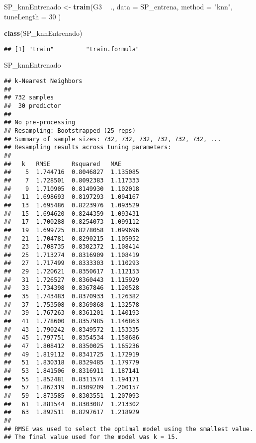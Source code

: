 \documentclass[
]{article}
\newenvironment{Shaded}{\begin{snugshade}}{\end{snugshade}}
\newcommand{\DataTypeTok}[1]{\textcolor[rgb]{0.13,0.29,0.53}{#1}}
\newcommand{\DecValTok}[1]{\textcolor[rgb]{0.00,0.00,0.81}{#1}}
\newcommand{\KeywordTok}[1]{\textcolor[rgb]{0.13,0.29,0.53}{\textbf{#1}}}
\newcommand{\NormalTok}[1]{#1}
\newcommand{\OperatorTok}[1]{\textcolor[rgb]{0.81,0.36,0.00}{\textbf{#1}}}
\newcommand{\StringTok}[1]{\textcolor[rgb]{0.31,0.60,0.02}{#1}}
\begin{document}
\begin{Shaded}
\begin{Highlighting}[]
\NormalTok{SP_knnEntrenado <-}\StringTok{ }\KeywordTok{train}\NormalTok{(G3 }\OperatorTok{~}\StringTok{ }\NormalTok{., }
                \DataTypeTok{data =}\NormalTok{ SP_entrena, }
                \DataTypeTok{method =} \StringTok{"knn"}\NormalTok{,  }
                \DataTypeTok{tuneLength =} \DecValTok{30}
\NormalTok{                )}

\KeywordTok{class}\NormalTok{(SP_knnEntrenado)}
\end{Highlighting}
\end{Shaded}

\begin{verbatim}
## [1] "train"         "train.formula"
\end{verbatim}

\begin{Shaded}
\begin{Highlighting}[]
\NormalTok{SP_knnEntrenado}
\end{Highlighting}
\end{Shaded}

\begin{verbatim}
## k-Nearest Neighbors 
## 
## 732 samples
##  30 predictor
## 
## No pre-processing
## Resampling: Bootstrapped (25 reps) 
## Summary of sample sizes: 732, 732, 732, 732, 732, 732, ... 
## Resampling results across tuning parameters:
## 
##   k   RMSE      Rsquared   MAE     
##    5  1.744716  0.8046827  1.135085
##    7  1.728501  0.8092383  1.117333
##    9  1.710905  0.8149930  1.102018
##   11  1.698693  0.8197293  1.094167
##   13  1.695486  0.8223976  1.093529
##   15  1.694620  0.8244359  1.093431
##   17  1.700288  0.8254073  1.099112
##   19  1.699725  0.8278058  1.099696
##   21  1.704781  0.8290215  1.105952
##   23  1.708735  0.8302372  1.108414
##   25  1.713274  0.8316909  1.108419
##   27  1.717499  0.8333303  1.110293
##   29  1.720621  0.8350617  1.112153
##   31  1.726527  0.8360443  1.115929
##   33  1.734398  0.8367846  1.120528
##   35  1.743483  0.8370933  1.126382
##   37  1.753508  0.8369868  1.132578
##   39  1.767263  0.8361201  1.140193
##   41  1.778600  0.8357985  1.146863
##   43  1.790242  0.8349572  1.153335
##   45  1.797751  0.8354534  1.158686
##   47  1.808412  0.8350025  1.165236
##   49  1.819112  0.8341725  1.172919
##   51  1.830318  0.8329485  1.179779
##   53  1.841506  0.8316911  1.187141
##   55  1.852481  0.8311574  1.194171
##   57  1.862319  0.8309209  1.200157
##   59  1.873585  0.8303551  1.207093
##   61  1.881544  0.8303087  1.213302
##   63  1.892511  0.8297617  1.218929
## 
## RMSE was used to select the optimal model using the smallest value.
## The final value used for the model was k = 15.
\end{verbatim}
\end{document}
